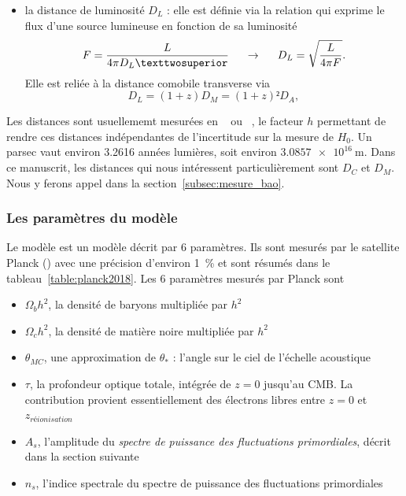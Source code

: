 \documentclass[11pt, twoside, a4paper, openright]{report}
\begin{document}
\begin{itemize}[label=$\bullet$]
\item la distance de luminosité $D_L$ : elle est définie via la relation qui exprime le flux d'une source lumineuse en fonction de sa luminosité
  \begin{equation}
    \label{eq:dist_lum}
    F = \frac{L}{4\pi D_L²} \hspace{0.5cm} \rightarrow \hspace{0.5cm} D_L = \sqrt{\frac{L}{4 \pi F}} .
  \end{equation}
  Elle est reliée à la distance comobile transverse via
  \begin{equation}
    D_L = (1+z) D_M = (1+z)² D_A ,
  \end{equation}
\end{itemize}

Les distances sont usuellememt mesurées en \si{\perh\kpc} ou \si{\perh\Mpc}, le facteur $h$ permettant de rendre ces distances indépendantes de l'incertitude sur la mesure de $H_{0}$. Un parsec vaut environ \num{3.2616} années lumières, soit environ $\SI{3,0857 e16}{\meter}$.
Dans ce manuscrit, les distances qui nous intéressent particulièrement sont $D_C$ et $D_M$. Nous y ferons appel dans la section~\ref{subsec:mesure_bao}.

\subsubsection{Les paramètres du modèle} 
Le modèle \lcdm{} est un modèle décrit par 6 paramètres. Ils sont mesurés par le satellite Planck (\cite{Collaboration2018}) avec une précision d'environ 1~\% et sont résumés dans le tableau~\ref{table:planck2018}. Les 6 paramètres mesurés par Planck sont
\begin{itemize}
\item $\Omega_bh^2$, la densité de baryons multipliée par $h^2$
\item $\Omega_ch^2$, la densité de matière noire multipliée par $h^2$
\item $\theta_{MC}$, une approximation de $\theta_*$ : l'angle sur le ciel de l'échelle acoustique
\item $\tau$, la profondeur optique totale, intégrée de $z=0$ jusqu'au CMB. La contribution provient essentiellement des électrons libres entre $z = 0$ et $z_{réionisation}$
\item $A_s$, l'amplitude du \emph{spectre de puissance des fluctuations primordiales}, décrit dans la section suivante
\item $n_s$, l'indice spectrale du spectre de puissance des fluctuations primordiales
\end{itemize}
\end{document}
